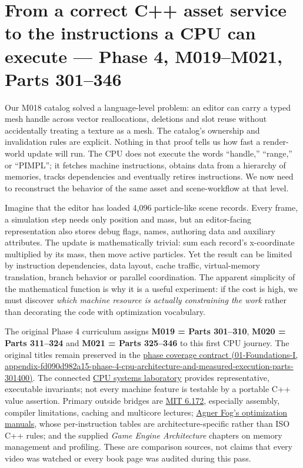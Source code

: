 \section{From a correct C++ asset service to the instructions a CPU can execute --- Phase 4, M019--M021, Parts 301--346}\label{05-engine-i-ch007-from-a-correct-c-asset-service-to-the-instructions-a-cpu-can-execute-phase-4-m019m021-parts-301346}

Our M018 catalog solved a language-level problem: an editor can carry a typed mesh handle across vector reallocations, deletions and slot reuse without accidentally treating a texture as a mesh. The catalog's ownership and invalidation rules are explicit. Nothing in that proof tells us how fast a render-world update will run. The CPU does not execute the words ``handle,'' ``range,'' or ``PIMPL''; it fetches machine instructions, obtains data from a hierarchy of memories, tracks dependencies and eventually retires instructions. We now need to reconstruct the behavior of the same asset and scene-workflow at that level.

Imagine that the editor has loaded 4,096 particle-like scene records. Every frame, a simulation step needs only position and mass, but an editor-facing representation also stores debug flags, names, authoring data and auxiliary attributes. The update is mathematically trivial: sum each record's x-coordinate multiplied by its mass, then move active particles. Yet the result can be limited by instruction dependencies, data layout, cache traffic, virtual-memory translation, branch behavior or parallel coordination. The apparent simplicity of the mathematical function is why it is a useful experiment: if the cost is high, we must discover \emph{which machine resource is actually constraining the work} rather than decorating the code with optimization vocabulary.

The original Phase 4 curriculum assigns \textbf{M019 = Parts 301--310}, \textbf{M020 = Parts 311--324} and \textbf{M021 = Parts 325--346} to this first CPU journey. The original titles remain preserved in the \href{../01-Foundations-I/main.pdf\#nameddest=appendix-fd090d982a15-phase-4-cpu-architecture-and-measured-execution-parts-301400}{phase coverage contract (01-Foundations-I, appendix-fd090d982a15-phase-4-cpu-architecture-and-measured-execution-parts-301400)}. The connected \href{tools/labs/phase4_cpu_systems_lab.cpp}{CPU systems laboratory} provides representative, executable invariants; not every machine feature is testable by a portable C++ value assertion. Primary outside bridges are \href{https://ocw.mit.edu/courses/6-172-performance-engineering-of-software-systems-fall-2018/video_galleries/lecture-videos/}{MIT 6.172}, especially assembly, compiler limitations, caching and multicore lectures; \href{https://www.agner.org/optimize/}{Agner Fog's optimization manuals}, whose per-instruction tables are architecture-specific rather than ISO C++ rules; and the supplied \emph{Game Engine Architecture} chapters on memory management and profiling. These are comparison sources, not claims that every video was watched or every book page was audited during this pass.

